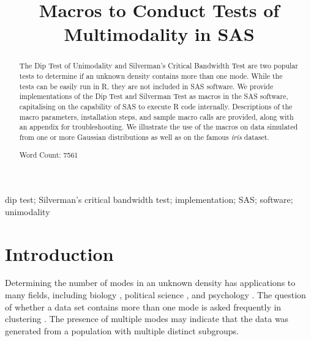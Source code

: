 \documentclass[]{interact}
\theoremstyle{plain}%
\theoremstyle{definition}
\theoremstyle{remark}
\begin{document}

\title{Macros to Conduct Tests of Multimodality in SAS}
\author{
}


\maketitle

\begin{abstract}
The Dip Test of Unimodality and Silverman's Critical Bandwidth Test are two popular tests to determine if an unknown density contains more than one mode. While the tests can be easily run in R, they are not included in SAS software. We provide implementations of the Dip Test and Silverman Test as macros in the SAS software, capitalising on the capability of SAS to execute R code internally. Descriptions of the macro parameters, installation steps, and sample macro calls are provided, along with an appendix for troubleshooting. We illustrate the use of the macros on data simulated from one or more Gaussian distributions as well as on the famous {\it iris} dataset.

Word Count: 7561
\end{abstract}

\begin{keywords}
dip test; Silverman's critical bandwidth test; implementation; SAS; software; unimodality
\end{keywords}

\section[Introduction]{Introduction}
Determining the number of modes in an unknown density has applications to many fields, including biology \citep{multmodex1}, political science \citep{multmodex2}, and psychology \citep{multmodex3}. The question of whether a data set contains more than one mode is asked frequently in  
clustering \citep{LuHayesNobelMarron,dip_means,Ahmed2012,sigtest}. The presence of multiple modes may indicate that the data was generated from a population with multiple distinct subgroups.
\end{document}
